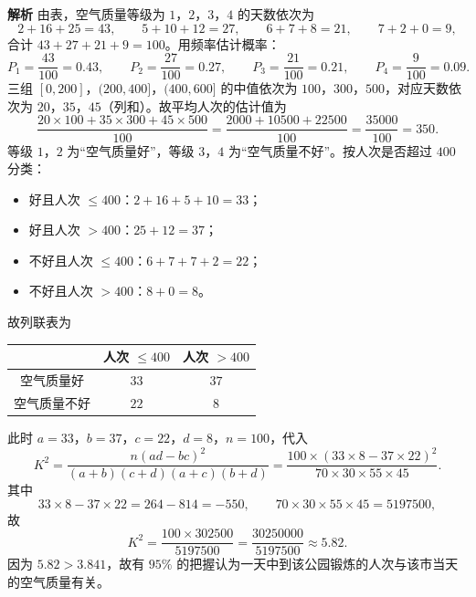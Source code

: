 \begin{answer}
\textbf{解析}
由表，空气质量等级为 $1$，$2$，$3$，$4$ 的天数依次为
\nopagebreak[4]
\[2+16+25=43,\qquad 5+10+12=27,\qquad 6+7+8=21,\qquad 7+2+0=9,\]
合计 $43+27+21+9=100$。用频率估计概率：
\nopagebreak[4]
\[P_1=\frac{43}{100}=0.43,\qquad P_2=\frac{27}{100}=0.27,\qquad P_3=\frac{21}{100}=0.21,\qquad P_4=\frac{9}{100}=0.09 .\]
三组 $[0,200]$，$(200,400]$，$(400,600]$ 的中值依次为 $100$，$300$，$500$，对应天数依次为 $20$，$35$，$45$（列和）。故平均人次的估计值为
\nopagebreak[4]
\[\frac{20\times100+35\times300+45\times500}{100}=\frac{2000+10500+22500}{100}=\frac{35000}{100}=350 .\]
等级 $1$，$2$ 为“空气质量好”，等级 $3$，$4$ 为“空气质量不好”。按人次是否超过 $400$ 分类：
\begin{itemize}
\item 好且人次 $\leqslant400$：$2+16+5+10=33$；
\item 好且人次 $>400$：$25+12=37$；
\item 不好且人次 $\leqslant400$：$6+7+7+2=22$；
\item 不好且人次 $>400$：$8+0=8$。
\end{itemize}
故列联表为

\begin{center}
\begin{tabular}{ccc}
\toprule
 & 人次 $\leqslant400$ & 人次 $>400$ \\
\midrule
空气质量好 & $33$ & $37$ \\
空气质量不好 & $22$ & $8$ \\
\bottomrule
\end{tabular}
\end{center}

此时 $a=33$，$b=37$，$c=22$，$d=8$，$n=100$，代入
\nopagebreak[4]
\[K^2=\frac{n(ad-bc)^2}{(a+b)(c+d)(a+c)(b+d)}=\frac{100\times(33\times8-37\times22)^2}{70\times30\times55\times45} .\]
其中
\nopagebreak[4]
\[33\times8-37\times22=264-814=-550,\qquad 70\times30\times55\times45=5197500,\]
故
\nopagebreak[4]
\[K^2=\frac{100\times302500}{5197500}=\frac{30250000}{5197500}\approx5.82 .\]
因为 $5.82>3.841$，故有 $95\%$ 的把握认为一天中到该公园锻炼的人次与该市当天的空气质量有关。




\end{answer}
